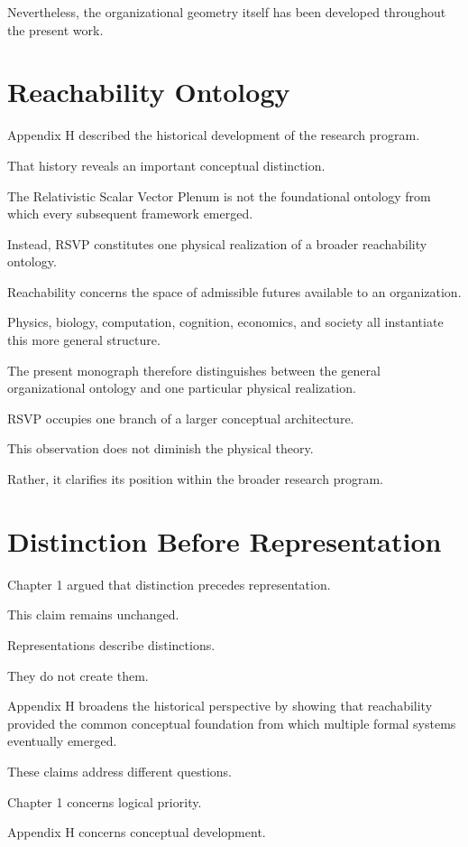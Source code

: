 \documentclass[11pt,oneside]{book}
\numberwithin{equation}{chapter}
\theoremstyle{definition}
\theoremstyle{plain}
\begin{document}
Nevertheless, the organizational geometry itself has been developed
throughout the present work.

\section{Reachability Ontology}

Appendix H described the historical development of the research program.

That history reveals an important conceptual distinction.

The Relativistic Scalar Vector Plenum is not the foundational ontology from
which every subsequent framework emerged.

Instead, RSVP constitutes one physical realization of a broader
reachability ontology.

Reachability concerns the space of admissible futures available to an
organization.

Physics, biology, computation, cognition, economics, and society all
instantiate this more general structure.

The present monograph therefore distinguishes between the general
organizational ontology and one particular physical realization.

RSVP occupies one branch of a larger conceptual architecture.

This observation does not diminish the physical theory.

Rather, it clarifies its position within the broader research program.

\section{Distinction Before Representation}

Chapter 1 argued that distinction precedes representation.

This claim remains unchanged.

Representations describe distinctions.

They do not create them.

Appendix H broadens the historical perspective by showing that reachability
provided the common conceptual foundation from which multiple formal
systems eventually emerged.

These claims address different questions.

Chapter 1 concerns logical priority.

Appendix H concerns conceptual development.
\end{document}
